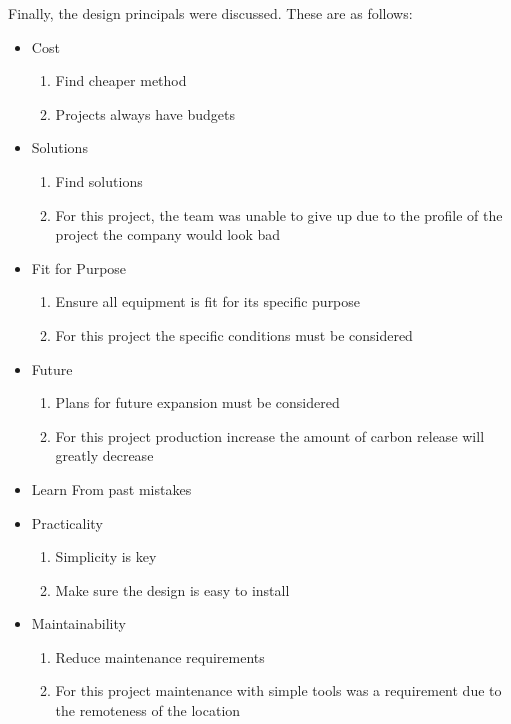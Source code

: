 \documentclass{article}
\begin{document}
Finally, the design principals were discussed. These are as follows:
\begin{itemize}
    
    \item{Cost}
        \begin{enumerate}
            \item{Find cheaper method}
            \item{Projects always have budgets}
        \end{enumerate}

    \item{Solutions}
        \begin{enumerate}
            \item{Find solutions}
            \item{For this project, the team was unable to give up due to the profile of the
                project the company would look bad}
        \end{enumerate}

    \item{Fit for Purpose}
        \begin{enumerate}
            \item{Ensure all equipment is fit for its specific purpose}
            \item{For this project the specific conditions must be considered}
        \end{enumerate}

    \item{Future}
        \begin{enumerate}
            \item{Plans for future expansion must be considered}
            \item{For this project production increase the amount of carbon release will greatly
                decrease}
        \end{enumerate}

    \item{Learn From past mistakes}

    \item{Practicality}
        \begin{enumerate}
            \item{Simplicity is key}
            \item{Make sure the design is easy to install}
        \end{enumerate}

    \item{Maintainability}
        \begin{enumerate}
            \item{Reduce maintenance requirements}
            \item{For this project maintenance with simple tools was a requirement due to the
                remoteness of the location}
        \end{enumerate}


\end{itemize}
\end{document}
